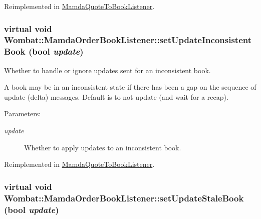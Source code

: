 Reimplemented in \hyperlink{classMamdaQuoteToBookListener_23babb647b9432258f2e9b36d1813357}{Mamda\-Quote\-To\-Book\-Listener}.\hypertarget{classWombat_1_1MamdaOrderBookListener_8d9563f0639d57630d786a614da5ad60}{
\subsubsection[setUpdateInconsistentBook]{\setlength{\rightskip}{0pt plus 5cm}virtual void Wombat::Mamda\-Order\-Book\-Listener::set\-Update\-Inconsistent\-Book (bool {\em update})}}
\label{classWombat_1_1MamdaOrderBookListener_8d9563f0639d57630d786a614da5ad60}


Whether to handle or ignore updates sent for an inconsistent book. 

A book may be in an inconsistent state if there has been a gap on the sequence of update (delta) messages. Default is to not update (and wait for a recap).

\begin{Desc}
\item[Parameters:]
\begin{description}
\item[{\em update}]Whether to apply updates to an inconsistent book. \end{description}
\end{Desc}


Reimplemented in \hyperlink{classMamdaQuoteToBookListener_99053d73f15f7f0dfc971d341e1e75c6}{Mamda\-Quote\-To\-Book\-Listener}.\hypertarget{classWombat_1_1MamdaOrderBookListener_a32964aa10c3d4f2021f55018585d4a7}{
\subsubsection[setUpdateStaleBook]{\setlength{\rightskip}{0pt plus 5cm}virtual void Wombat::Mamda\-Order\-Book\-Listener::set\-Update\-Stale\-Book (bool {\em update})}}
\label{classWombat_1_1MamdaOrderBookListener_a32964aa10c3d4f2021f55018585d4a7}



